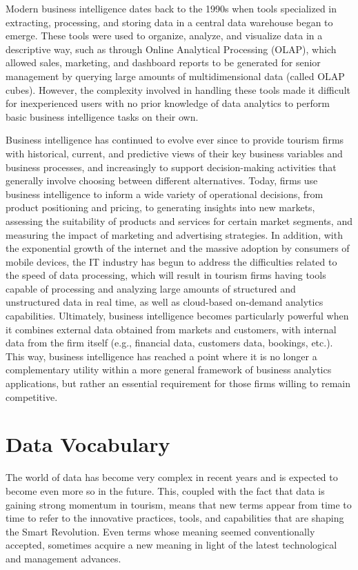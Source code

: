 \documentclass[
  letterpaper,
  DIV=11,
  numbers=noendperiod]{scrreprt}
\begin{document}
Modern business intelligence dates back to the 1990s when tools
specialized in extracting, processing, and storing data in a central
data warehouse began to emerge. These tools were used to organize,
analyze, and visualize data in a descriptive way, such as through Online
Analytical Processing (OLAP), which allowed sales, marketing, and
dashboard reports to be generated for senior management by querying
large amounts of multidimensional data (called OLAP cubes). However, the
complexity involved in handling these tools made it difficult for
inexperienced users with no prior knowledge of data analytics to perform
basic business intelligence tasks on their own.

Business intelligence has continued to evolve ever since to provide
tourism firms with historical, current, and predictive views of their
key business variables and business processes, and increasingly to
support decision-making activities that generally involve choosing
between different alternatives. Today, firms use business intelligence
to inform a wide variety of operational decisions, from product
positioning and pricing, to generating insights into new markets,
assessing the suitability of products and services for certain market
segments, and measuring the impact of marketing and advertising
strategies. In addition, with the exponential growth of the internet and
the massive adoption by consumers of mobile devices, the IT industry has
begun to address the difficulties related to the speed of data
processing, which will result in tourism firms having tools capable of
processing and analyzing large amounts of structured and unstructured
data in real time, as well as cloud-based on-demand analytics
capabilities. Ultimately, business intelligence becomes particularly
powerful when it combines external data obtained from markets and
customers, with internal data from the firm itself (e.g., financial
data, customers data, bookings, etc.). This way, business intelligence
has reached a point where it is no longer a complementary utility within
a more general framework of business analytics applications, but rather
an essential requirement for those firms willing to remain competitive.

\hypertarget{data-vocabulary}{%
\section{Data Vocabulary}\label{data-vocabulary}}

The world of data has become very complex in recent years and is
expected to become even more so in the future. This, coupled with the
fact that data is gaining strong momentum in tourism, means that new
terms appear from time to time to refer to the innovative practices,
tools, and capabilities that are shaping the Smart Revolution. Even
terms whose meaning seemed conventionally accepted, sometimes acquire a
new meaning in light of the latest technological and management
advances.
\end{document}
